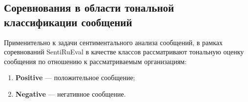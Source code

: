     \subsection{Соревнования в области тональной классификации сообщений}


    Применительно к задачи сентиментального анализа сообщений, в рамках соревнований
    SentiRuEval в качестве классов рассматривают тональную оценку сообщения по
    отношению к рассматриваемым организациям:
    \begin{enumerate}
        \item {\bf Positive} --- положительное сообщение;
        \item {\bf Negative} --- негативное сообщение.
    \end{enumerate}


